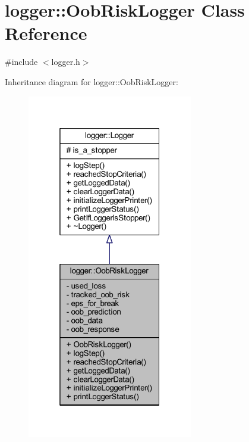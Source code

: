 \hypertarget{classlogger_1_1_oob_risk_logger}{}\section{logger\+:\+:Oob\+Risk\+Logger Class Reference}
\label{classlogger_1_1_oob_risk_logger}


{\ttfamily \#include $<$logger.\+h$>$}



Inheritance diagram for logger\+:\+:Oob\+Risk\+Logger\+:\nopagebreak
\begin{figure}[H]
\begin{center}
\leavevmode
\includegraphics[width=205pt]{classlogger_1_1_oob_risk_logger__inherit__graph}
\end{center}
\end{figure}


